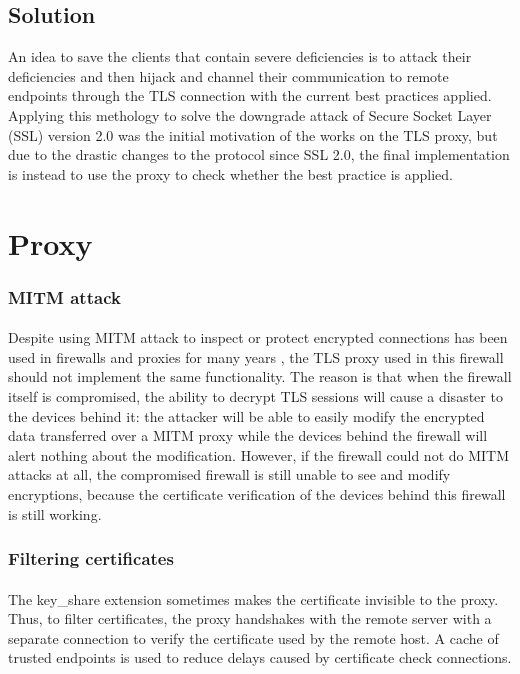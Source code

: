 \documentclass[mscthesis]{usiinfthesis}
\begin{document}
\subsection{Solution}
An idea to save the clients that contain severe deficiencies is to attack their deficiencies and then hijack and channel their communication to remote endpoints through the TLS connection with the current best practices applied. Applying this methology to solve the downgrade attack of Secure Socket Layer (SSL) version 2.0 was the initial motivation of the works on the TLS proxy, but due to the drastic changes to the protocol since SSL 2.0, the final implementation is instead to use the proxy to check whether the best practice is applied.


\section{Proxy}
\subsubsection{MITM attack}
\paragraph{}
Despite using MITM attack to inspect or protect encrypted connections has been used in firewalls and proxies for many years \citep{fortigate:deepinspection}, the TLS proxy used in this firewall should not implement the same functionality. The reason is that when the firewall itself is compromised, the ability to decrypt TLS sessions will cause a disaster to the devices behind it: the attacker will be able to easily modify the encrypted data transferred over a MITM proxy while the devices behind the firewall will alert nothing about the modification. However, if the firewall could not do MITM attacks at all, the compromised firewall is still unable to see and modify encryptions, because the certificate verification of the devices behind this firewall is still working.
\subsubsection{Filtering certificates}
\paragraph{}
The key\_share extension sometimes makes the certificate invisible to the proxy. Thus, to filter certificates, the proxy handshakes with the remote server with a separate connection to verify the certificate used by the remote host. A cache of trusted endpoints is used to reduce delays caused by certificate check connections.
\end{document}
